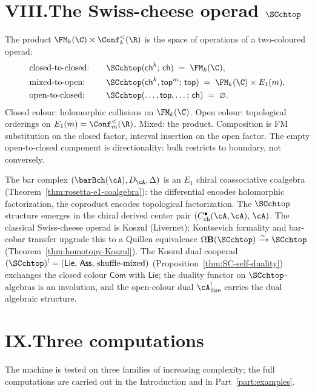 \section*{VIII.\quad The Swiss-cheese operad $\SCchtop$}

The product $\FM_k(\C) \times \Conf_k^<(\R)$ is the space of
operations of a two-coloured operad:
\begin{alignat*}{2}
&\text{closed-to-closed:}\quad
&&\SCchtop(\mathsf{ch}^k;\,\mathsf{ch})
\;=\; \FM_k(\C), \\
&\text{mixed-to-open:}\quad
&&\SCchtop(\mathsf{ch}^k, \mathsf{top}^m;\,\mathsf{top})
\;=\; \FM_k(\C) \times E_1(m), \\
&\text{open-to-closed:}\quad
&&\SCchtop(\ldots, \mathsf{top}, \ldots;\,\mathsf{ch})
\;=\; \varnothing.
\end{alignat*}
Closed colour: holomorphic collisions on $\FM_k(\C)$. Open
colour: topological orderings on $E_1(m) = \Conf_m^<(\R)$.
Mixed: the product. Composition is FM substitution on the closed
factor, interval insertion on the open factor. The empty
open-to-closed component is directionality: bulk restricts to
boundary, not conversely.

The bar complex $(\barBch(\cA), D_\cA, \Delta)$ is an $E_1$ chiral
coassociative coalgebra (Theorem~\ref{thm:rosetta-e1-coalgebra}): the
differential encodes holomorphic factorization, the coproduct
encodes topological factorization. The $\SCchtop$ structure
emerges in the chiral derived center pair
$(C^\bullet_{\mathrm{ch}}(\cA,\cA),\, \cA)$.
The classical Swiss-cheese operad
is Koszul (Livernet); Kontsevich formality and bar-cobar transfer
upgrade this to a Quillen equivalence
$\Omega\mathbf{B}(\SCchtop) \xrightarrow{\sim} \SCchtop$
(Theorem~\ref{thm:homotopy-Koszul}). The Koszul dual cooperad
$(\SCchtop)^! = (\mathsf{Lie},\, \mathsf{Ass},\, \text{shuffle-mixed})$
(Proposition~\ref{thm:SC-self-duality}) exchanges the closed colour
$\mathsf{Com}$ with $\mathsf{Lie}$; the duality functor on
$\SCchtop$-algebras is an involution, and the open-colour dual
$\cA^!_{\mathrm{line}}$ carries the dual algebraic structure.

\section*{IX.\quad Three computations}

The machine is tested on three families of increasing complexity;
the full computations are carried out in the Introduction and in
Part~\ref{part:examples}.

